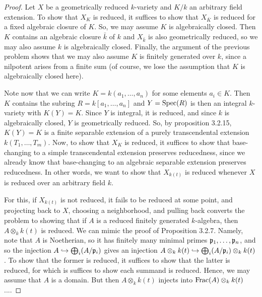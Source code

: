 \begin{proof}
	Let $X$ be a geometrically reduced $k$-variety and $K/k$ an arbitrary field extension. To show that $X_K$ is reduced, it suffices to show that $X_{\bar{K}}$ is reduced for a fixed algebraic closure of $K$. So, we may assume $K$ is algebraically closed. Then $K$ contains an algebraic closure $\bar{k}$ of $k$ and $X_{\bar{k}}$ is also geometrically reduced, so we may also assume $k$ is algebraically closed. Finally, the argument of the previous problem shows that we may also assume $K$ is finitely generated over $k$, since a nilpotent arises from a finite sum (of course, we lose the assumption that $K$ is algebraically closed here).
	
	Note now that we can write $K = k(a_1,\ldots,a_n)$ for some elements $a_i \in K$. Then $K$ contains the subring $R = k[a_1,\ldots,a_n]$ and $Y = \operatorname{Spec}(R)$ is then an integral $k$-variety with $K(Y) = K$. Since $Y$ is integral, it is reduced, and since $k$ is algebraically closed, $Y$ is geometrically reduced. So, by proposition 3.2.15, $K(Y) = K$ is a finite separable extension of a purely transcendental extension $k(T_1,\ldots,T_m)$. Now, to show that $X_K$ is reduced, it suffices to show that base-changing to a simple transcendental extension preserves reducedness, since we already know that base-changing to an algebraic separable extension preserves reducedness. In other words, we want to show that $X_{k(t)}$ is reduced whenever $X$ is reduced over an arbitrary field $k$.
	
	For this, if $X_{k(t)}$ is not reduced, it fails to be reduced at some point, and projecting back to $X$, choosing a neighborhood, and pulling back converts the problem to showing that if $A$ is a reduced finitely generated $k$-algebra, then $A \otimes_k k(t)$ is reduced. We can mimic the proof of Proposition 3.2.7. Namely, note that $A$ is Noetherian, so it has finitely many minimal primes $\mathfrak{p}_1,\ldots,\mathfrak{p}_n$, and so the injection $A \hookrightarrow \bigoplus_i (A/\mathfrak{p}_i)$ gives an injection $A \otimes_k k(t) \hookrightarrow \bigoplus_i (A/\mathfrak{p}_i) \otimes_k k(t)$. To show that the former is reduced, it suffices to show that the latter is reduced, for which is suffices to show each summand is reduced. Hence, we may assume that $A$ is a domain. But then $A \otimes_k k(t)$ injects into $\operatorname{Frac}(A) \otimes_k k(t)$....
\end{proof}
